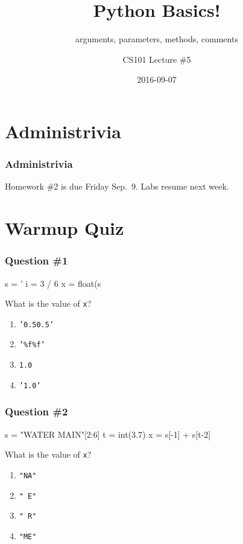 \documentclass[11pt]{beamer}
\title{Python Basics!}
\subtitle{arguments, parameters, methods, comments}
\author{CS101 Lecture \#5}
\date{2016-09-07}
\begin{document}
  \setcounter{showProgressBar}{0}
  \setcounter{showSlideNumbers}{0}

\frame{\titlepage}

\setcounter{framenumber}{0}
\setcounter{showProgressBar}{1}
\setcounter{showSlideNumbers}{1}

\section{Administrivia}

\begin{frame}
  \frametitle{Administrivia}
  \Enlarge
  \begin{itemize}
  \myitem  Homework \#2 is due Friday Sep.\ 9.
  \myitem  Labs resume next week.
  \end{itemize}
\end{frame}

\section{Warmup Quiz}

\begin{frame}[fragile]
  \frametitle{Question \#1}
  \Enlarge

  \begin{semiverbatim}
s = '%
i = 3 / 6
x = float(s%
  \end{semiverbatim}
  What is the value of \texttt{x}?
  \begin{enumerate}[label=\Alph*]
  \item  \texttt{'0.50.5'}
  \item  \texttt{'\%f\%f'}
  \item  \texttt{1.0}
  \item  \texttt{'1.0'}
  \end{enumerate}
\end{frame}

\begin{frame}[fragile]
  \frametitle{Question \#2}
  \Enlarge

  \begin{semiverbatim}
s = "WATER MAIN"[2:6]
t = int(3.7)
x = s[-1] + s[t-2]
  \end{semiverbatim}
  What is the value of \texttt{x}?
  \begin{enumerate}[label=\Alph*]
  \item  \texttt{"NA"}
  \item  \texttt{" E"}
  \item  \texttt{" R"}
  \item  \texttt{"ME"}
  \end{enumerate}
\end{frame}
\end{document}
